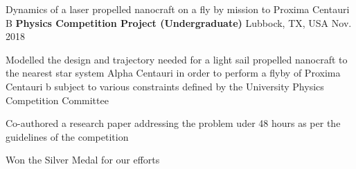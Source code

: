 \begin{cventries}
  \cventry
  {Dynamics of a laser propelled nanocraft on a fly by mission to Proxima Centauri B}
  {\textbf{Physics Competition Project (Undergraduate)}}
    {Lubbock, TX, USA}
    {Nov. 2018}
    {
      \begin{cvitems}
      \item{Modelled the design and trajectory needed for a light sail propelled nanocraft to the nearest star system Alpha Centauri in order to perform a flyby of Proxima Centauri b subject to various constraints defined by the University Physics Competition Committee}
      \item{Co-authored a research paper addressing the problem uder 48 hours as per the guidelines of the competition}
     \item{Won the Silver Medal for our efforts}
      \end{cvitems}
    }




\end{cventries}
